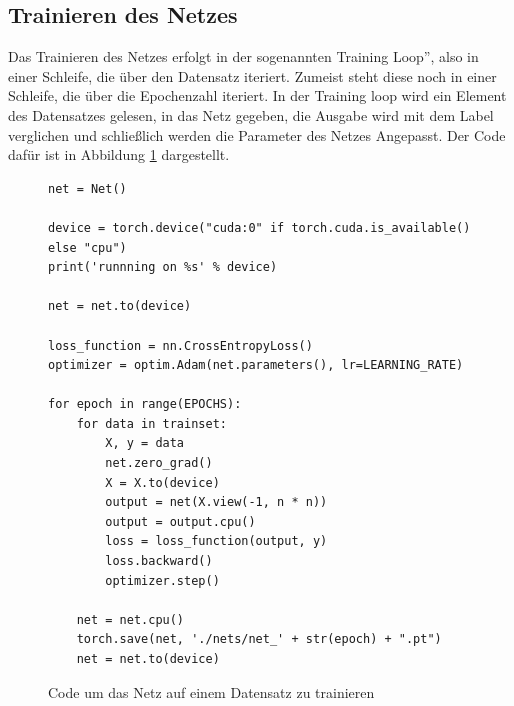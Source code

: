 \documentclass[11pt]{article}
\begin{document}
\subsection{Trainieren des Netzes}
Das Trainieren des Netzes erfolgt in der sogenannten \glqq Training Loop'', also in einer Schleife, die über den Datensatz iteriert. Zumeist steht diese noch in einer Schleife, die über die Epochenzahl iteriert. In der Training loop wird ein Element des Datensatzes gelesen, in das Netz gegeben, die Ausgabe wird mit dem Label verglichen und schließlich werden die Parameter des Netzes Angepasst. Der Code dafür ist in Abbildung \ref{Code_train_loop} dargestellt.
 \begin{figure}[h]
 	\begin{verbatim}
net = Net()

device = torch.device("cuda:0" if torch.cuda.is_available() else "cpu")
print('runnning on %s' % device)

net = net.to(device)

loss_function = nn.CrossEntropyLoss()
optimizer = optim.Adam(net.parameters(), lr=LEARNING_RATE)

for epoch in range(EPOCHS):
	for data in trainset:
		X, y = data
		net.zero_grad() 
		X = X.to(device)
		output = net(X.view(-1, n * n))
		output = output.cpu()
		loss = loss_function(output, y)  
		loss.backward() 
		optimizer.step()  
		
	net = net.cpu()
	torch.save(net, './nets/net_' + str(epoch) + ".pt")
	net = net.to(device)

 	\end{verbatim}
 	\caption{Code um das Netz auf einem Datensatz zu trainieren}
 	\label{Code_train_loop}
 \end{figure}\\
\end{document}
